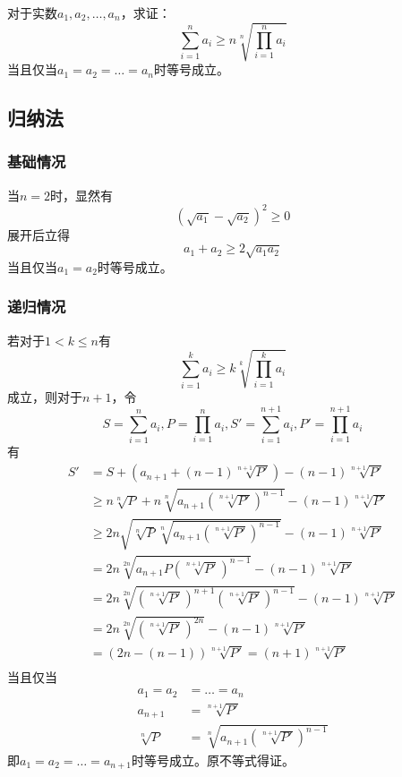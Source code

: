 

对于实数$a_1, a_2, \dots, a_n$，求证：
\[ \sum_{i = 1}^n a_i \ge n\sqrt[n]{\prod_{i = 1}^n a_i} \]
当且仅当$a_1 = a_2 = \dots = a_n$时等号成立。

\subsection{归纳法}

\subsubsection{基础情况}

当$n = 2$时，显然有
\[ \left(\sqrt{a_1} - \sqrt{a_2}\right)^2 \ge 0 \]
展开后立得
\[ a_1 + a_2 \ge 2\sqrt{a_1a_2} \]
当且仅当$a_1 = a_2$时等号成立。

\subsubsection{递归情况}

若对于$1 < k \le n$有
\[ \sum_{i = 1}^k a_i \ge k\sqrt[k]{\prod_{i = 1}^k a_i} \]
成立，则对于$n + 1$，令
\[ S = \sum_{i = 1}^n a_i, P = \prod_{i = 1}^n a_i, S' = \sum_{i = 1}^{n + 1} a_i, P' = \prod_{i = 1}^{n + 1} a_i \]
有
\begin{align*}
  S' &= S + \left(a_{n + 1} + (n - 1)\sqrt[n + 1]{P'}\right) - (n - 1)\sqrt[n + 1]{P'} \\
  &\ge n\sqrt[n]{P} + n\sqrt[n]{a_{n + 1}\left(\sqrt[n + 1]{P'}\right)^{n - 1}} - (n - 1)\sqrt[n + 1]{P'} \\
  &\ge 2n\sqrt{\sqrt[n]{P}\sqrt[n]{a_{n + 1}\left(\sqrt[n + 1]{P'}\right)^{n - 1}}} - (n - 1)\sqrt[n + 1]{P'} \\
  &= 2n\sqrt[2n]{a_{n + 1}P\left(\sqrt[n + 1]{P'}\right)^{n - 1}} - (n - 1)\sqrt[n + 1]{P'} \\
  &= 2n\sqrt[2n]{\left(\sqrt[n + 1]{P'}\right)^{n + 1}\left(\sqrt[n + 1]{P'}\right)^{n - 1}} - (n - 1)\sqrt[n + 1]{P'} \\
  &= 2n\sqrt[2n]{\left(\sqrt[n + 1]{P'}\right)^{2n}} - (n - 1)\sqrt[n + 1]{P'} \\
  &= (2n - (n - 1))\sqrt[n + 1]{P'} = (n + 1)\sqrt[n + 1]{P'} \\
\end{align*}
当且仅当
\begin{align*}
  a_1 = a_2 &= \dots = a_n \\
  a_{n + 1} &= \sqrt[n + 1]{P'} \\
  \sqrt[n]{P} &= \sqrt[n]{a_{n + 1}\left(\sqrt[n + 1]{P'}\right)^{n - 1}}
\end{align*}
即$a_1 = a_2 = \dots = a_{n + 1}$时等号成立。原不等式得证。
